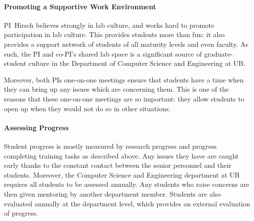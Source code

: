 \paragraph{Promoting a Supportive Work Environment}

PI~Hirsch believes strongly in lab culture, and works hard to promote participation in lab culture.
This provides students more than fun: it also provides a support network of students of all maturity levels and even faculty.
As such, the PI and co-PI's shared lab space is a significant source of graduate-student culture in the Department of Computer Science and Engineering at UB.

Moreover, both PIs one-on-one meetings ensure that students have a time when they can bring up any issues which are concerning them.
This is one of the reasons that these one-on-one meetings are so important: they allow students to open up when they would not do so in other situations.

\paragraph{Assessing Progress}
Student progress is mostly measured by research progress and progress completing training tasks as described above.
Any issues they have are caught early thanks to the constant contact between the senior personnel and their students.
Moreover, the Computer Science and Engineering department at UB requires all students to be assessed annually.
Any students who raise concerns are then given mentoring by another department member.  Students are also evaluated annually at the department
level, which provides an external evaluation of progress.



